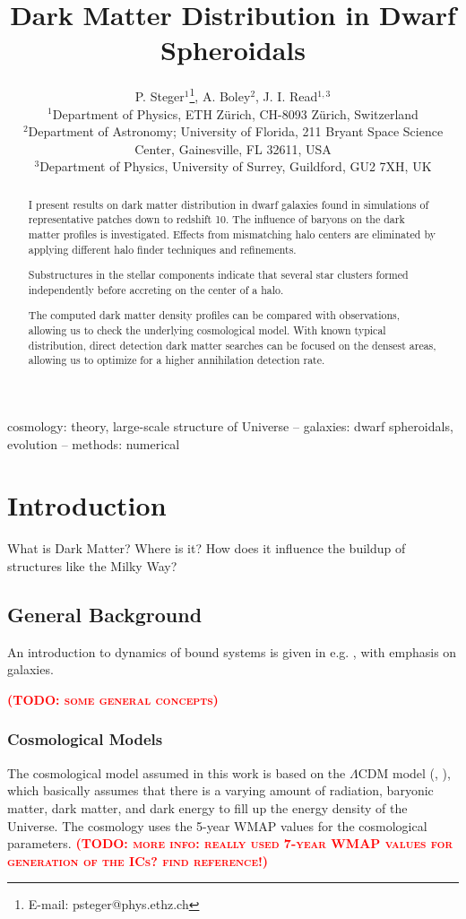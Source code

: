 \documentclass[useAMS,usenatbib]{mn2e}
\title[Dark Matter Distribution in Dwarf Spheroidals]
     {Dark Matter Distribution in Dwarf Spheroidals}
\author[P. Steger et al.]{P. Steger$^{1}$\thanks{E-mail: psteger@phys.ethz.ch},
 A. Boley$^{2}$,
 J. I. Read$^{1,3}$\\
 $^{1}$Department of Physics, ETH Z\"urich, CH-8093 Z\"urich,
 Switzerland\\
 $^{2}$Department of Astronomy; University of Florida, 211 Bryant
 Space Science Center, Gainesville, FL 32611, USA\\
 $^{3}$Department of Physics, University of Surrey, Guildford, GU2 7XH, UK
}
\newcommand{\TODO}[1]{\textsc{\textbf{\textcolor{red}{(TODO: #1)}}}}
\begin{document}
\maketitle

\label{firstpage}
\begin{abstract}
    I present results on dark matter distribution in dwarf galaxies
    found in simulations of representative patches down to redshift
    10. The influence of baryons on the dark matter profiles is
    investigated. Effects from mismatching halo centers are eliminated
    by applying different halo finder techniques and refinements.

    Substructures in the stellar components indicate that several star
    clusters formed independently before accreting on the center of a
    halo.

    The computed dark matter density profiles can be compared with
    observations, allowing us to check the underlying cosmological
    model. With known typical distribution, direct detection dark
    matter searches can be focused on the densest areas, allowing us
    to optimize for a higher annihilation detection rate.
\end{abstract}
%
\begin{keywords}
 cosmology: theory, large-scale structure of Universe --
 galaxies: dwarf spheroidals, evolution --
 methods: numerical
\end{keywords}
%
\section{Introduction}
\label{sec:intro}
What is Dark Matter? Where is it? How does it influence the buildup of
structures like the Milky Way?

\subsection{General Background}
An introduction to dynamics of bound systems is given in
e.g. \cite{Binney2008}, with emphasis on galaxies.


\TODO{some general concepts}

\subsubsection{Cosmological Models}
The cosmological model assumed in this work is based on the
$\Lambda$CDM model (\cite{Weinberg2008}, \cite{Peacock1999}), which
basically assumes that there is a varying amount of radiation,
baryonic matter, dark matter, and dark energy to fill up the energy
density of the Universe. The cosmology uses the 5-year WMAP values
\citep{Komatsu2009} for the cosmological parameters. \TODO{more info:
  really used 7-year WMAP values for generation of the ICs? find
  reference!}
\end{document}
